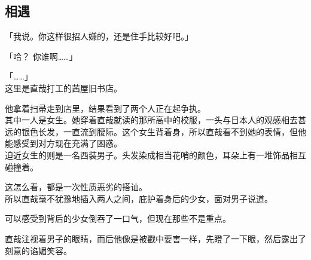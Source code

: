 \subsection{相遇}

「我说。你这样很招人嫌的，还是住手比较好吧。」

「哈？ 你谁啊……」

「……」\\

这里是直哉打工的茜屋旧书店。

他拿着扫帚走到店里，结果看到了两个人正在起争执。\\ %

其中一人是女生。她穿着直哉就读的那所高中的校服，一头与日本人的观感相去甚远的银色长发，一直流到腰际。这个女生背着身，所以直哉看不到她的表情，但他能感受到对方现在充满了困惑。\\

迫近女生的则是一名西装男子。头发染成相当花哨的颜色，耳朵上有一堆饰品相互碰撞着。

这怎么看，都是一次性质恶劣的搭讪。\\

所以直哉毫不犹豫地插入两人之间，庇护着身后的少女，面对男子说道。

可以感受到背后的少女倒吞了一口气，但现在那些不是重点。

直哉注视着男子的眼睛，而后他像是被戳中要害一样，先瞪了一下眼，然后露出了刻意的谄媚笑容。\\

